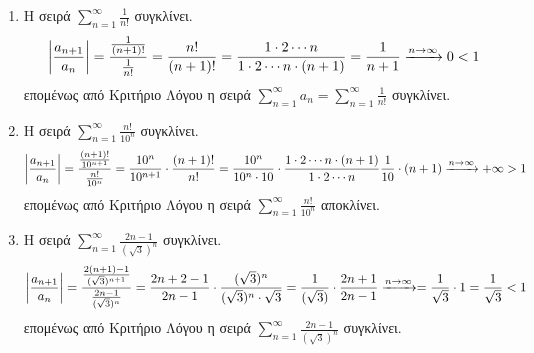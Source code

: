 \documentclass[a4paper,table]{report}
\begin{document}
\begin{examples}
\item {}
    \begin{enumerate}
        \item Η σειρά $ \sum_{n=1}^{\infty} \frac{1}{n!} $ συγκλίνει.
            \[
                \abs{\frac{a_{n+1}}{a_{n}}} = \frac{\frac{1}{(n+1)!}}{\frac{1}{n!}} = 
                \frac{n!}{(n+1)!} = \frac{1 \cdot 2 \cdots n }{1 \cdot 2 
                \cdots n \cdot(n+1)} = \frac{1}{n+1} \xrightarrow{n \to \infty } 0 < 1 
            \]
            επομένως από Κριτήριο Λόγου η σειρά $ \sum_{n=1}^{\infty} a_{n} = 
            \sum_{n=1}^{\infty} \frac{1}{n!}$ συγκλίνει.


        \item Η σειρά $ \sum_{n=1}^{\infty} \frac{n!}{10^{n}} $ συγκλίνει.
            \[
                \abs{\frac{a_{n+1}}{a_{n}}} = 
                \frac{\frac{(n+1)!}{10^{n+1}}}{\frac{n!}{10^{n}}} =
                \frac{10^{n}}{10^{n+1}} \cdot \frac{(n+1)!}{n!} = 
                \frac{10^{n}}{10^{n} \cdot 10}
                \cdot \frac{1\cdot 2 \cdots n \cdot (n+1)}{1\cdot 2 \cdots n}  
                \frac{1}{10} \cdot (n+1) \xrightarrow{n \to \infty} + \infty > 1
            \] 
            επομένως από Κριτήριο Λόγου η σειρά 
            $ \sum_{n=1}^{\infty} \frac{n!}{10^{n}} $ αποκλίνει.

        \item Η σειρά $ \sum_{n=1}^{\infty} \frac{2n-1}{(\sqrt{3}) ^{n}} $ συγκλίνει.
            \[
                \abs{\frac{a_{n+1}}{a_{n}}} = \frac{\frac{2(n+1)-1}{(\sqrt{3}
                )^{n+1}}}{\frac{2n-1}{(\sqrt{3} )^{n}}} = \frac{2n+2-1}{2n-1} \cdot 
                \frac{(\sqrt{3} )^{n}}{(\sqrt{3} )^{n}\cdot \sqrt{3}} = 
                \frac{1}{(\sqrt{3})} \cdot \frac{2n+1}{2n-1} 
                \xrightarrow{n \to \infty} = \frac{1}{\sqrt{3}} \cdot 1 =
                \frac{1}{\sqrt{3}} < 1
            \] 
            επομένως από Κριτήριο Λόγου η σειρά 
            $ \sum_{n=1}^{\infty} \frac{2n-1}{(\sqrt{3}) ^{n}} $ συγκλίνει.
    \end{enumerate}
\end{examples}
\end{document}

